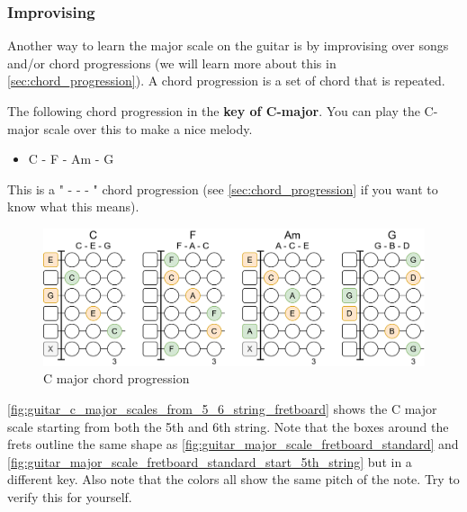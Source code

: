 \subsubsection{Improvising}

Another way to learn the major scale on the guitar is by improvising over songs and/or chord progressions (we will learn more about this in \autoref{sec:chord_progression}). A chord progression is a set of chord that is repeated.

The following chord progression in the \textbf{key of C-major}. You can play the C-major scale over this to make a nice melody.


\begin{itemize}
	\item C - F - Am - G
\end{itemize}

This is a " -  -  - " chord progression (see \autoref{sec:chord_progression} if you want to know what this means).

\begin{figure}[h]
	\centering
	\includegraphics[height=0.19\textheight]{../../Images/CMajor_chord_progression.png}
	\caption{C major chord progression}
	\label{fig:c_major_chord_progression}
\end{figure}

\autoref{fig:guitar_c_major_scales_from_5_6_string_fretboard} shows the C major scale starting from both the 5th and 6th string. Note that the boxes around the frets outline the same shape as \autoref{fig:guitar_major_scale_fretboard_standard} and \autoref{fig:guitar_major_scale_fretboard_standard_start_5th_string} but in a different key. Also note that the colors all show the same pitch of the note. Try to verify this for yourself.

